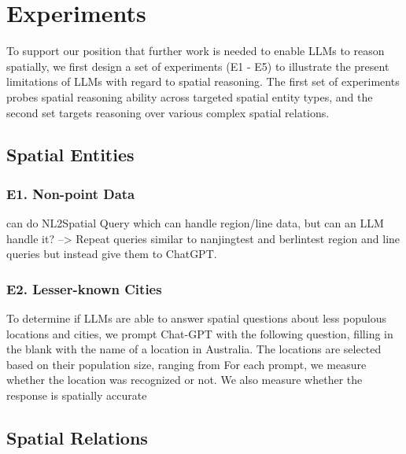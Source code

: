 \section{Experiments}
\label{section:experiments}

To support our position that further work is needed to enable LLMs to reason spatially, we first design a set of experiments (E1 - E5) to illustrate the present limitations of LLMs with regard to spatial reasoning.
The first set of experiments probes spatial reasoning ability across targeted spatial entity types, and the second set targets reasoning over various complex spatial relations.


\subsection{Spatial Entities} %

\subsubsection{E1. Non-point Data}
\cite{Liu2023} can do NL2Spatial Query which can handle region/line data, but can an LLM handle it?
--> Repeat queries similar to \cite{Liu2023} nanjingtest and berlintest region and line queries but instead give them to ChatGPT.

\subsubsection{E2. Lesser-known Cities}
To determine if LLMs are able to answer spatial questions about less populous locations and cities, we prompt Chat-GPT with the following question, filling in the blank with the name of a location in Australia.
The locations are selected based on their population size, ranging from 
For each prompt, we measure whether the location was recognized or not.
We also measure whether the response is spatially accurate 





\subsection{Spatial Relations} %

